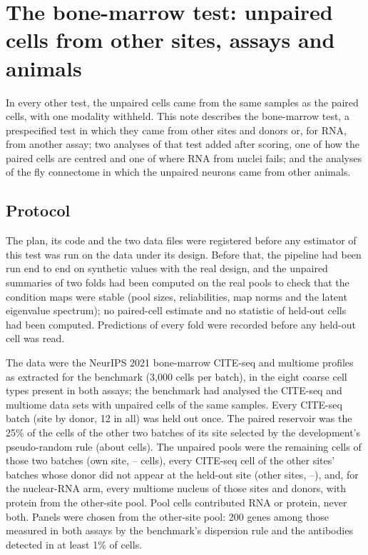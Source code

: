 \section{The bone-marrow test: unpaired cells from other sites, assays and animals}\label{sec:deploy}
In every other test, the unpaired cells came from the same samples as the paired cells, with one modality withheld. This note describes the bone-marrow test, a prespecified test in which they came from other sites and donors or, for RNA, from another assay; two analyses of that test added after scoring, one of how the paired cells are centred and one of where RNA from nuclei fails; and the analyses of the fly connectome in which the unpaired neurons came from other animals.

\subsection*{Protocol}
The plan, its code and the two data files were registered before any estimator of this test was run on the data under its design. Before that, the pipeline had been run end to end on synthetic values with the real design, and the unpaired summaries of two folds had been computed on the real pools to check that the condition maps were stable (pool sizes, reliabilities, map norms and the latent eigenvalue spectrum); no paired-cell estimate and no statistic of held-out cells had been computed. Predictions of every fold were recorded before any held-out cell was read.

The data were the NeurIPS 2021 bone-marrow CITE-seq and multiome profiles\cite{luecken2021sandbox} as extracted for the benchmark (3,000 cells per batch), in the eight coarse cell types present in both assays; the benchmark had analysed the CITE-seq and multiome data sets with unpaired cells of the same samples. Every CITE-seq batch (site by donor, 12 in all) was held out once. The paired reservoir was the 25\% of the cells of the other two batches of its site selected by the development's pseudo-random rule (about \DpReservoir{} cells). The unpaired pools were the remaining cells of those two batches (own site, \DpPoolSameMin--\DpPoolSameMax{} cells), every CITE-seq cell of the other sites' batches whose donor did not appear at the held-out site (other sites, \DpPoolOtherMin--\DpPoolOtherMax), and, for the nuclear-RNA arm, every multiome nucleus of those sites and donors, with protein from the other-site pool. Pool cells contributed RNA or protein, never both. Panels were chosen from the other-site pool: 200 genes among those measured in both assays by the benchmark's dispersion rule and the antibodies detected in at least 1\% of cells.

